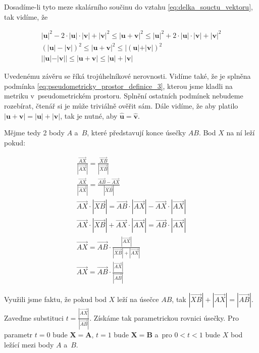 \documentclass{book}
\newcommand{\vect}[1]{\boldsymbol{#1}}
\newcommand{\unitvect}[1]{\hat{\boldsymbol{#1}}}
\newcommand{\vectpoints}[1]{\overrightarrow{#1}}
\begin{document}
Dosadíme-li tyto meze skalárního součinu do vztahu \eqref{eq:delka_souctu_vektoru}, tak vidíme, že 

\begin{equation}
\begin{split}
|\vect{u}|^2 - 2 \cdot |\vect{u}| \cdot |\vect{v}| + |\vect{v}|^2 \leq |\vect{u} + \vect{v}|^2 \leq
|\vect{u}|^2 + 2 \cdot |\vect{u}| \cdot |\vect{v}| + |\vect{v}|^2 \\
(|\vect{u}| - |\vect{v}|)^2 \leq |\vect{u} + \vect{v}|^2 \leq
|(\vect{u}|+ |\vect{v}|)^2 \\
||\vect{u}| - |\vect{v}|| \leq |\vect{u} + \vect{v}| \leq
|\vect{u}|+ |\vect{v}|
\end{split}
\end{equation}

Uvedenému závěru se říká trojúhelníkové nerovnosti.
Vidíme také, že je splněna podmínka \eqref{eq:pseudometricky_prostor_definice_3}, kterou jsme kladli na metriku v~pseudometrickém prostoru. Splnění ostatních podmínek nebudeme rozebírat, čtenář si je může triviálně ověřit sám. Dále vidíme, že aby platilo \(|\vect{u} + \vect{v}| = |\vect{u}| + |\vect{v}|\), tak
je nutné, aby \(\unitvect{u} = \unitvect{v}\).

Mějme tedy 2 body \(A\) a~\(B\), které představují konce úsečky \(AB\). Bod \(X\) na ní leží pokud:

\begin{equation}
\begin{split}
\frac{\vectpoints{AX}}{|\vectpoints{AX}|} = \frac{\vectpoints{XB}}{|\vectpoints{XB}|} \\
\frac{\vectpoints{AX}}{|\vectpoints{AX}|} = \frac{\vectpoints{AB} - \vectpoints{AX}}{|\vectpoints{XB}|} \\
\vectpoints{AX} \cdot |\vectpoints{XB}| = \vectpoints{AB} \cdot |\vectpoints{AX}| - \vectpoints{AX} \cdot |\vectpoints{AX}| \\
\vectpoints{AX} \cdot |\vectpoints{XB}| + \vectpoints{AX} \cdot |\vectpoints{AX}| = \vectpoints{AB} \cdot |\vectpoints{AX}| \\
\vectpoints{AX} = \vectpoints{AB} \cdot \frac{|\vectpoints{AX}|}{|\vectpoints{XB}| + |\vectpoints{AX}|} \\
\vectpoints{AX} = \vectpoints{AB} \cdot \frac{|\vectpoints{AX}|}{|\vectpoints{AB}|}
\end{split}
\end{equation}

Využili jsme faktu, že pokud bod \(X\) leží na úsečce \(AB\), tak \(|\vectpoints{XB}| + |\vectpoints{AX}| = |\vectpoints{AB}|\). Zaveďme substituci \(t = \frac{|\vectpoints{AX}|}{|\vectpoints{AB}|}\). Získáme tak parametrickou rovnici úsečky. Pro parametr \(t = 0\) bude \(\vect{X} = \vect{A}\), \(t = 1\) bude \(\vect{X} = \vect{B}\) a~pro \(0 < t < 1\) bude \(X\) bod ležící mezi body \(A\) a~\(B\).
\end{document}
